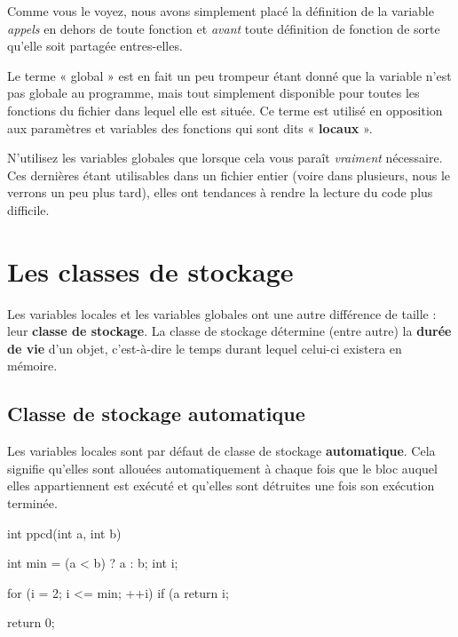 Comme vous le voyez, nous avons simplement placé la définition de la
variable \emph{appels} en dehors de toute fonction et \emph{avant} toute
définition de fonction de sorte qu'elle soit partagée entres-elles.

\begin{infobox}
Le terme « global » est en fait un peu trompeur étant donné que la variable
n'est pas globale au programme, mais tout simplement disponible pour toutes
les fonctions du fichier dans lequel elle est située. Ce terme est utilisé
en opposition aux paramètres et variables des fonctions qui sont dits
« \textbf{locaux} ».
\end{infobox}


\begin{attentionbox}
  N'utilisez les variables globales que
lorsque cela vous paraît \emph{vraiment} nécessaire. Ces dernières étant
utilisables dans un fichier entier (voire dans plusieurs, nous le
verrons un peu plus tard), elles ont tendances à rendre la lecture du
code plus difficile.
\end{attentionbox}


\section{Les classes de stockage}
\label{les-classes-de-stockage}

Les variables locales et les variables globales ont une autre différence
de taille : leur \textbf{classe de stockage}. La classe de stockage
détermine (entre autre) la \textbf{durée de vie} d'un objet,
c'est-à-dire le temps durant lequel celui-ci existera en mémoire.

\subsection{Classe de stockage automatique}
\label{classe-de-stockage-automatique}

Les variables locales sont par défaut de classe de stockage
\textbf{automatique}. Cela signifie qu'elles sont allouées
automatiquement à chaque fois que le bloc auquel elles appartiennent est
exécuté et qu'elles sont détruites une fois son exécution terminée.

\begin{C}
int ppcd(int a, int b)
{
    int min = (a < b) ? a : b;
    int i;

    for (i = 2; i <= min; ++i)
        if (a %
            return i;

    return 0;
}
\end{C}

